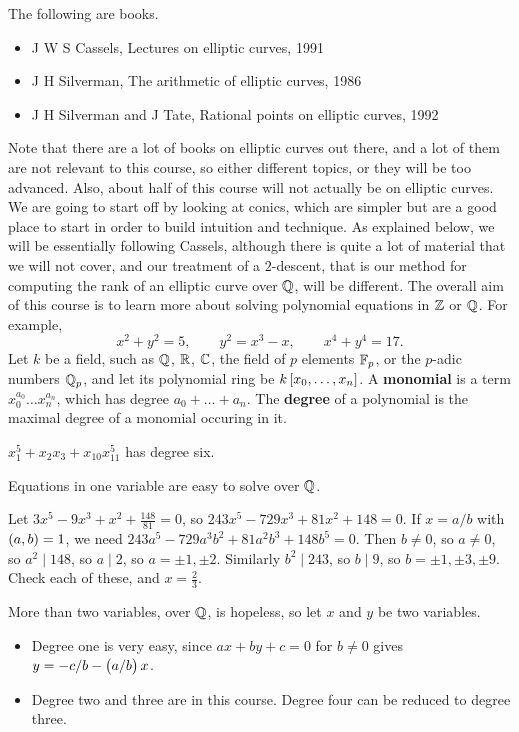 The following are books.
\begin{itemize}
\item J W S Cassels, Lectures on elliptic curves, 1991
\item J H Silverman, The arithmetic of elliptic curves, 1986
\item J H Silverman and J Tate, Rational points on elliptic curves, 1992
\end{itemize}
Note that there are a lot of books on elliptic curves out there, and a lot of them are not relevant to this course, so either different topics, or they will be too advanced. Also, about half of this course will not actually be on elliptic curves. We are going to start off by looking at conics, which are simpler but are a good place to start in order to build intuition and technique. As explained below, we will be essentially following Cassels, although there is quite a lot of material that we will not cover, and our treatment of a $ 2 $-descent, that is our method for computing the rank of an elliptic curve over $ \mathbb{Q} $, will be different. The overall aim of this course is to learn more about solving polynomial equations in $ \mathbb{Z} $ or $ \mathbb{Q} $. For example,
$$ x^2 + y^2 = 5, \qquad y^2 = x^3 - x, \qquad x^4 + y^4 = 17. $$
Let $ k $ be a field, such as $ \mathbb{Q} $, $ \mathbb{R} $, $ \mathbb{C} $, the field of $ p $ elements $ \mathbb{F}_p $, or the $ p $-adic numbers $ \mathbb{Q}_p $, and let its polynomial ring be $ k\sbr{x_0, \dots, x_n} $. A \textbf{monomial} is a term $ x_0^{a_0}\dots x_n^{a_n} $, which has degree $ a_0 + \dots + a_n $. The \textbf{degree} of a polynomial is the maximal degree of a monomial occuring in it.

\begin{example*}
$ x_1^5 + x_2x_3 + x_{10}x_{11}^5 $ has degree six.
\end{example*}

Equations in one variable are easy to solve over $ \mathbb{Q} $.

\begin{example*}
Let $ 3x^5 - 9x^3 + x^2 + \tfrac{148}{81} = 0 $, so $ 243x^5 - 729x^3 + 81x^2 + 148 = 0 $. If $ x = a / b $ with $ \br{a, b} = 1 $, we need $ 243a^5 - 729a^3b^2 + 81a^2b^3 + 148b^5 = 0 $. Then $ b \ne 0 $, so $ a \ne 0 $, so $ a^2 \mid 148 $, so $ a \mid 2 $, so $ a = \pm 1, \pm 2 $. Similarly $ b^2 \mid 243 $, so $ b \mid 9 $, so $ b = \pm 1, \pm 3, \pm 9 $. Check each of these, and $ x = \tfrac{2}{3} $.
\end{example*}

More than two variables, over $ \mathbb{Q} $, is hopeless, so let $ x $ and $ y $ be two variables.
\begin{itemize}
\item Degree one is very easy, since $ ax + by + c = 0 $ for $ b \ne 0 $ gives $ y = -c / b - \br{a / b}x $.
\item Degree two and three are in this course. Degree four can be reduced to degree three.
\end{itemize}

